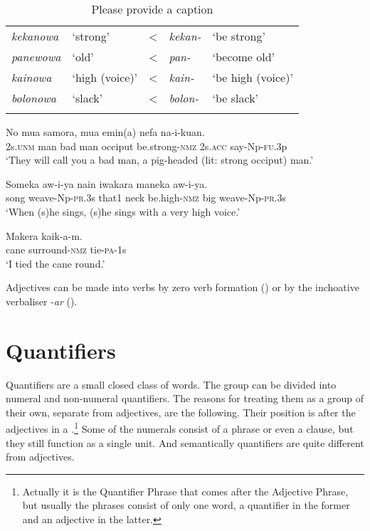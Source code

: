 \begin{table}
\caption{Please provide a caption}
 
\begin{tabular}{>{\itshape}llc>{\itshape}ll}
\mytoprule
kekanowa &`strong' &{{\textless}} &kekan- &`be strong'\\
panewowa &`old' &{{\textless}} &pan- &`become old'\\
kainowa &`high (voice)' &{{\textless}} &kain- &`be high (voice)'\\
bolonowa &`slack' &{{\textless}} &bolon- &`be slack'\\
\mybottomrule
\end{tabular}
\end{table}


\ea%
\label{ex:3:x1766}
\gll No mua samora, mua emin(a) \textstyleEmphasizedVernacularWords{-} nefa na-i-kuan.\\
2s.\textsc{unm} man bad man occiput be.strong-\textsc{nmz} 2s.\textsc{acc} say-Np-\textsc{fu}.3p\\
\glt`They will call you a bad man, a pig-headed (lit: strong occiput) man.'
\z

\ea%
\label{ex:3:x1765}
\gll Someka aw-i-ya nain iwakara  maneka aw-i-ya.\\
song weave-Np-\textsc{pr}.3s that1 neck be.high-\textsc{nmz} big weave-Np-\textsc{pr}.3s\\
\glt`When (s)he sings, (s)he sings with a very high voice.'
\z

\ea%
\label{ex:3:x1767}
\gll Makera \textstyleEmphasizedVernacularWords{-} kaik-a-m. \\
cane surround-\textsc{nmz} tie-\textsc{pa}-1s\\
\glt`I tied the cane round.'
\z

Adjectives can be made into verbs by zero verb formation () or by the inchoative verbaliser \nobreakdash-\textit{ar} ().

\section{Quantifiers}\label{sec:3.4}
{}
Quantifiers are a small closed class of words. The group can be divided into numeral and non-numeral quantifiers. The reasons for treating them as a group of their own, separate from adjectives, are the following. Their position is after the adjectives in a .\footnote{Actually it is the Quantifier Phrase that comes after the Adjective Phrase, but usually the phrases consist of only one word, a quantifier in the former and an adjective in the latter.} Some of the numerals consist of a phrase or even a clause, but they still function as a single unit. And semantically quantifiers are quite different from adjectives.

